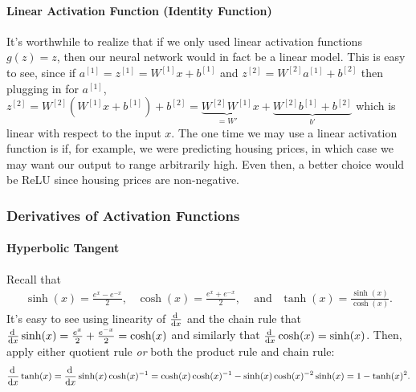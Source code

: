 \documentclass[12pt]{article}
\begin{document}
\paragraph{Linear Activation Function (Identity Function)} It's worthwhile to realize that if we only used linear activation functions $g(z) = z$, then our neural network would in fact be a linear model. This is easy to see, since if $a^{[1]} = z^{[1]} = W^{[1]} x + b^{[1]}$ and $z^{[2]} = W^{[2]} a^{[1]} + b^{[2]}$ then plugging in for $a^{[1]}$, $z^{[2]} = W^{[2]} (W^{[1]} x + b^{[1]}) + b^{[2]} = \underbrace{W^{[2]}W^{[1]}}_{=W'}x + \underbrace{W^{[2]}b^{[1]} + b^{[2]}}_{b'}$ which is linear with respect to the input $x$. The one time we may use a linear activation function is if, for example, we were predicting housing prices, in which case we may want our output to range arbitrarily high. Even then, a better choice would be ReLU since housing prices are non-negative.

\subsubsection{Derivatives of Activation Functions} 
\paragraph{Hyperbolic Tangent}
Recall that 
\begin{align*}   \sinh(x) = \frac{e^x - e^{-x}}{2}, \hspace{10pt} 
  \cosh(x) = \frac{e^x + e^{-x}}{2}, \hspace{10pt} \textrm{ and } \hspace{5pt}
  \tanh(x) = \frac{\sinh(x)}{\cosh(x)}. \end{align*}
It's easy to see using linearity of $\frac{\operatorname{d}\!{\,}}{\operatorname{d}\!{x}}$ and the chain rule that $\frac{\operatorname{d}\!{\,}}{\operatorname{d}\!{x}}  \sinh(x) = \frac{e^x}{2} + \frac{e^{-x}}{2} = \cosh(x)$ and similarly that $\frac{\operatorname{d}\!{\,}}{\operatorname{d}\!{x}}\cosh(x) = \sinh(x)$. Then, apply either quotient rule \emph{or} both the product rule and chain rule:
\begin{align*}   \frac{\operatorname{d}\!{\,}}{\operatorname{d}\!{x}} \tanh(x) = \frac{\operatorname{d}\!{\,}}{\operatorname{d}\!{x}} \sinh(x) \cosh(x)^{-1} = \cosh(x) \cosh(x)^{-1} - \sinh(x)\cosh(x)^{-2}\sinh(x) = 1 - \tanh(x)^2. \end{align*}
\end{document}
